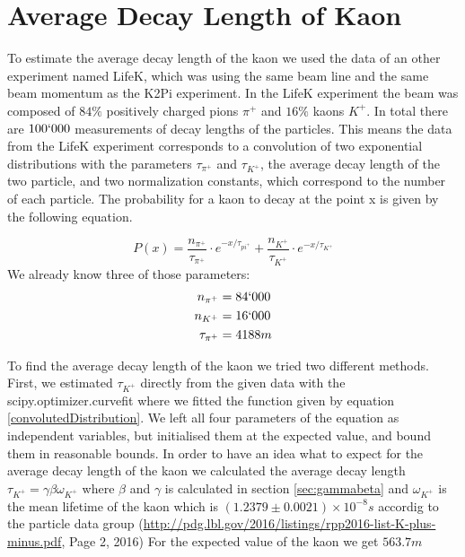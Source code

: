 \documentclass[10pt,a4paper]{report}
\begin{document}
\newpage


\section{Average Decay Length of Kaon}


To estimate the average decay length of the kaon we used the data of an other experiment named LifeK, which was using the same beam line and the same beam momentum as the K2Pi experiment. In the LifeK experiment the beam was composed of $84\%$ positively charged pions $\pi^+$ and $16\%$ kaons $K^+$. In total there are $100`000$ measurements of decay lengths of the particles. This means the data from the LifeK experiment corresponds to a convolution of two exponential distributions with the parameters $\tau_{\pi^+}$ and $\tau_{K^+}$, the average decay length of the two particle, and two normalization constants, which correspond to the number of each particle. The probability for a kaon to decay at the point x is given by the following equation.

\begin{equation}
\label{convolutedDistribution}
P(x)=  \frac{n_{\pi^+}}{\tau_{\pi^+}} \cdot e^{-x/ \tau_{pi^+}} + \frac{n_{K^+}}{\tau_{K^+}} \cdot e^{-x/ \tau_{K^+}}
\end{equation} 
We already know three of those parameters:
\begin{align*}
n_{\pi^+} &= 84`000 \\
n_{K^+} &= 16`000 \\
\tau_{\pi^+} &= 4188 m
\end{align*}

To find the average decay length of the kaon we tried two different methods.\\
First, we estimated $\tau_{K^+}$ directly from the given data with the scipy.optimizer.curvefit where we fitted the function given by equation \ref{convolutedDistribution}. We left all four parameters of the equation as independent variables, but initialised them at the expected value, and bound them in reasonable bounds. In order to have an idea what to expect for the average decay length of the kaon we calculated the average decay length $\tau_{K^+}= \gamma \beta \omega_{K^+}$ where $\beta$ and $\gamma$ is calculated in section \ref{sec:gammabeta} and $\omega_{K^+}$ is the mean lifetime of the kaon which is $(1.2379 \pm 0.0021) \times 10^{-8} s $ accordig to the particle data group (\url{http://pdg.lbl.gov/2016/listings/rpp2016-list-K-plus-minus.pdf}, Page 2, 2016) For the expected value of the kaon we get $563.7 m$
\end{document}
